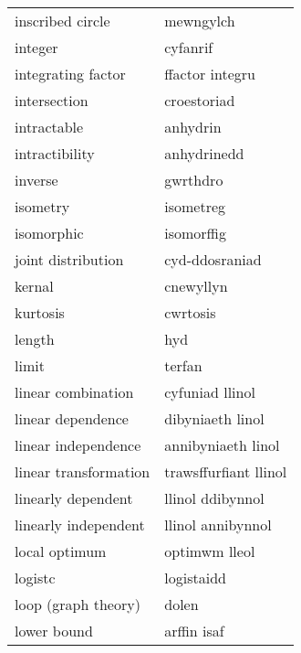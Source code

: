 \begin{supertabular}{p{0.22\textwidth}p{0.22\textwidth}}
                 inscribed circle &                        mewngylch \\
                          integer &                         cyfanrif \\
               integrating factor &                  ffactor integru \\
                     intersection &                      croestoriad \\
                      intractable &                         anhydrin \\
                   intractibility &                      anhydrinedd \\
                          inverse &                         gwrthdro \\
                         isometry &                        isometreg \\
                       isomorphic &                       isomorffig \\
               joint distribution &                   cyd-ddosraniad \\
                           kernal &                        cnewyllyn \\
                         kurtosis &                         cwrtosis \\
                           length &                              hyd \\
                            limit &                           terfan \\
               linear combination &                  cyfuniad llinol \\
                linear dependence &                 dibyniaeth linol \\
              linear independence &               annibyniaeth linol \\
            linear transformation &            trawsffurfiant llinol \\
               linearly dependent &                 llinol ddibynnol \\
             linearly independent &                llinol annibynnol \\
                    local optimum &                    optimwm lleol \\
                          logistc &                       logistaidd \\
              loop (graph theory) &                            dolen \\
                      lower bound &                      arffin isaf \\

\end{supertabular}
